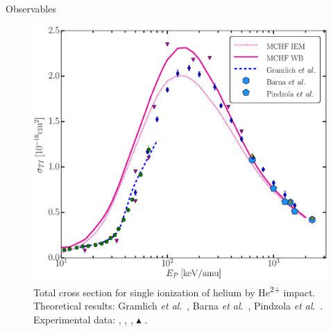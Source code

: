 \documentclass[letterpaper, 12 pt]{report}
\begin{document}
\begin{chapter}{Observables \label{chap:p-he2p-he}}
\begin{figure}[htp]
   \centering
   \includegraphics[width = \linewidth]{./images/he2phe/he2phe-TI.eps}
   \caption[Total cross section for single ionization of helium by He\textsuperscript{2+}
            impact.]{Total cross section for single ionization of helium by He\textsuperscript{2+}
            impact. Theoretical results: Gramlich \textit{et al}.\ \cite{GGS-89}, Barna \textit{et al}.\
            \cite{BTB-05}, Pindzola \textit{et al}.\ \cite{PRC-07}.
            Experimental data: {\color{blue}{$\blacklozenge$}} \cite{SG85},
            {\color{OliveGreen}{$\bullet$}} \cite{SG89},
            {\color{RedViolet}{$\blacktriangledown$}} \cite{Dubois87},
            {\color{GreenYellow}$\blacktriangle$} \cite{KAH84}. \label{fig:he2phe-ti}}
\end{figure}


\end{chapter}
\end{document}
